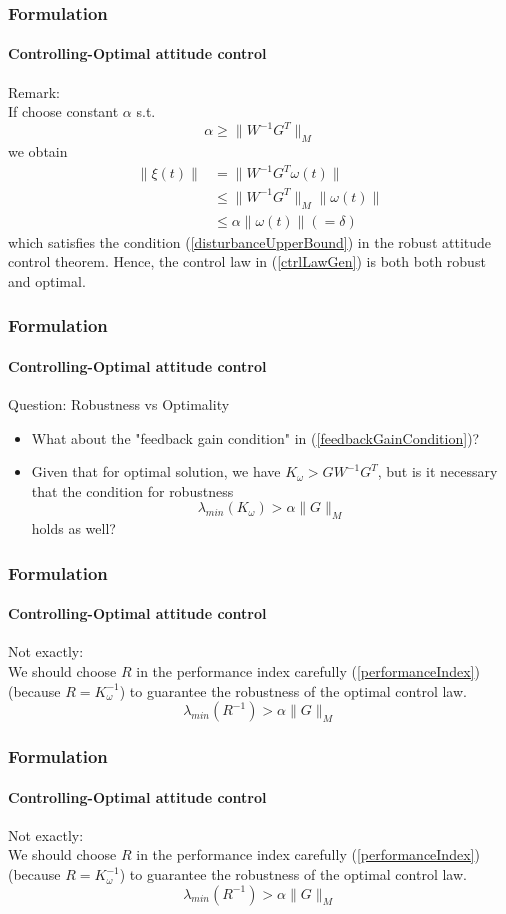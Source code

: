 \documentclass{beamer}
\begin{document}
\begin{frame}
\frametitle{Formulation}
\framesubtitle{Controlling-Optimal attitude control}
Remark:\\
If choose constant $\alpha$ s.t. 
\begin{equation} \label{Alpha for Optimal}
\alpha\geq\lVert W^{-1}G^{T}\rVert_{M}
\end{equation}
we obtain
\begin{equation}
\begin{split}
\lVert\xi(t)\rVert&=\lVert W^{-1}G^{T}\omega(t)\rVert\\
&\leq\lVert W^{-1}G^{T}\rVert_{M}\lVert\omega(t)\rVert\\
&\leq\alpha\lVert\omega(t)\rVert(=\delta)
\end{split}
\end{equation}
which satisfies the condition (\ref{disturbanceUpperBound}) in the robust attitude control theorem.
Hence, the control law in (\ref{ctrlLawGen}) is both both robust and optimal. \\
\end{frame}

\begin{frame}
\frametitle{Formulation}
\framesubtitle{Controlling-Optimal attitude control}
Question: Robustness vs Optimality
\begin{itemize}
	\item What about the "feedback gain condition" in (\ref{feedbackGainCondition})? 
	\item Given that for optimal solution, we have $K_{\omega}>GW^{-1}G^{T}$, but is it necessary that the condition for robustness $$\lambda_{min}(K_{\omega})>\alpha\lVert G\rVert_{M}$$ holds as well?
\end{itemize}
\end{frame}

\begin{frame}
\frametitle{Formulation}
\framesubtitle{Controlling-Optimal attitude control}
Not exactly: \\
We should choose $R$ in the performance index carefully (\ref{performanceIndex}) (because $R=K_{\omega}^{-1}$) to guarantee the robustness of the optimal control law.\\
$$\lambda_{min}(R^{-1})>\alpha\lVert G\rVert_{M}$$
\end{frame}

\begin{frame}
\frametitle{Formulation}
\framesubtitle{Controlling-Optimal attitude control}
Not exactly: \\
We should choose $R$ in the performance index carefully (\ref{performanceIndex}) (because $R=K_{\omega}^{-1}$) to guarantee the robustness of the optimal control law.\\
$$\lambda_{min}(R^{-1})>\alpha\lVert G\rVert_{M}$$
\end{frame}
\end{document}
